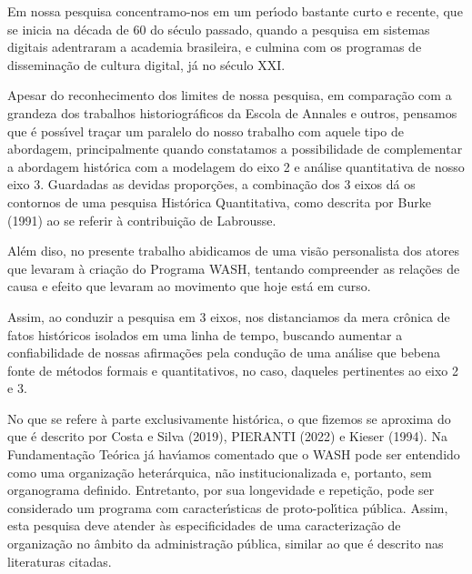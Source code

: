 \documentclass[
12pt,		%
openright,	%
twoside,  %
a4paper,			%
chapter=TITLE,		%
english,			%
french,				%
spanish,			%
brazil				%
]{USPSC-classe/USPSC}
\begin{document}
Em nossa pesquisa concentramo-nos em um per\'{\i}odo bastante curto e recente, que se inicia na d\'ecada de 60 do s\'eculo passado, quando a pesquisa em sistemas digitais adentraram a academia brasileira, e culmina com os programas de dissemina\c{c}\~ao de cultura digital, j\'a no s\'eculo XXI.




Apesar do reconhecimento dos limites de nossa pesquisa, em compara\c{c}\~ao com a grandeza dos trabalhos historiogr\'aficos da Escola de Annales e outros, pensamos que \'e poss\'{\i}vel tra\c{c}ar um paralelo do nosso trabalho com aquele tipo de abordagem, principalmente quando constatamos a possibilidade de complementar a abordagem hist\'orica com a modelagem do eixo 2 e an\'alise quantitativa de nosso eixo 3. Guardadas as devidas propor\c{c}\~oes, a combina\c{c}\~ao dos 3 eixos d\'a os contornos de uma pesquisa Hist\'orica Quantitativa, como descrita por  Burke (1991) ao se referir \`a contribui\c{c}\~ao de Labrousse.




Al\'em diso, no presente trabalho abidicamos de uma vis\~ao personalista dos atores que levaram \`a cria\c{c}\~ao do Programa WASH, tentando compreender as rela\c{c}\~oes de causa e efeito que levaram ao movimento que hoje est\'a em curso.




Assim, ao conduzir a pesquisa em 3 eixos, nos distanciamos da mera cr\^onica de fatos hist\'oricos isolados em uma linha de tempo, buscando aumentar a confiabilidade de nossas afirma\c{c}\~oes pela condu\c{c}\~ao de uma an\'alise que \textquotedbl bebe\textquotedbl  na fonte de m\'etodos formais e quantitativos, no caso, daqueles pertinentes ao eixo 2 e 3.




No que se refere \`a parte exclusivamente hist\'orica, o que fizemos se aproxima do que \'e descrito por   Costa e Silva (2019), PIERANTI (2022) e  Kieser (1994). Na Fundamenta\c{c}\~ao Te\'orica j\'a hav\'{\i}amos comentado que o WASH pode ser entendido como uma organiza\c{c}\~ao heter\'arquica, n\~ao institucionalizada e, portanto, sem organograma definido. Entretanto, por sua longevidade e repeti\c{c}\~ao, pode ser considerado um programa com caracter\'{\i}sticas de proto-pol\'{\i}tica p\'ublica. Assim, esta pesquisa deve atender \`as especificidades de uma caracteriza\c{c}\~ao de organiza\c{c}\~ao no \^ambito da administra\c{c}\~ao p\'ublica, similar ao que \'e descrito nas literaturas citadas.
\end{document}

